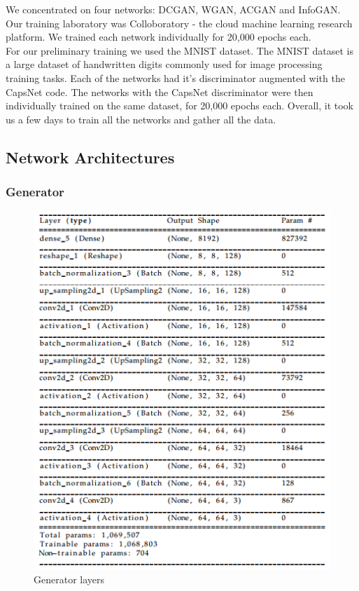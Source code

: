 \documentclass{vldb}
\begin{document}
We concentrated on four networks: DCGAN, WGAN, ACGAN and InfoGAN. Our training laboratory was Colloboratory - the cloud machine learning research platform. We trained each network individually for 20,000 epochs each. \\
For our preliminary training we used the MNIST dataset. The MNIST dataset is a large dataset of handwritten digits commonly used for image processing training tasks. Each of the networks had it's discriminator augmented with the CapsNet code. The networks with the CapsNet discriminator were then individually trained on the same dataset, for 20,000 epochs each. Overall, it took us a few days to train all the networks and gather all the data.


\subsection{Network Architectures} %
\label{sec:network_architectures}

\subsubsection{Generator} %
\label{sub:Generator}
\begin{figure}[H]
\centering\includegraphics[width=\linewidth]{../Final_Report/images/generator_layers.png}
\caption{Generator layers}
\label{fig:generator}
\end{figure} 
\newpage
\end{document}
